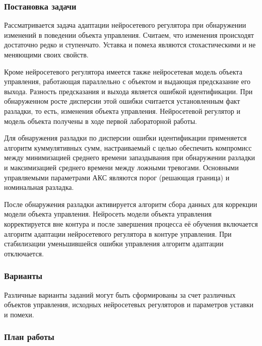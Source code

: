 \subsubsection{Постановка задачи}

Рассматривается задача адаптации нейросетевого регулятора при
обнаружении изменений в поведении объекта управления.  Считаем, что
изменения происходят достаточно редко и ступенчато.  Уставка и помеха
являются стохастическими и не меняющими своих свойств.

Кроме нейросетевого регулятора имеется также нейросетевая модель
объекта управления, работающая параллельно с объектом и выдающая
предсказание его выхода.  Разность предсказания и выхода является
ошибкой идентификации.  При обнаруженном росте дисперсии этой ошибки
считается установленным факт разладки, то есть, изменения объекта
управления.  Нейросетевой регулятор и модель объекта получены в ходе
первой лабораторной работы.

Для обнаружения разладки по дисперсии ошибки идентификации применяется
алгоритм куммулятивных сумм, настраиваемый с целью обеспечить
компромисс между минимизацией среднего времени запаздывания при
обнаружении разладки и максимизацией среднего времени между ложными
тревогами.  Основными управляемыми параметрами АКС являются порог
(решающая граница) и номинальная разладка.

После обнаружения разладки активируется алгоритм сбора данных для
коррекции модели объекта управления.  Нейросеть модели объекта
управления корректируется вне контура и после завершения процесса её
обучения включается алгоритм адаптации нейросетевого регулятора в
контуре управления.  При стабилизации уменьшившейся ошибки управления
алгоритм адаптации отключается.

\subsubsection{Варианты}

Различные варианты заданий могут быть сформированы за счет различных
объектов управления, исходных нейросетевых регуляторов и параметров
уставки и помехи.

\subsubsection{План работы}

